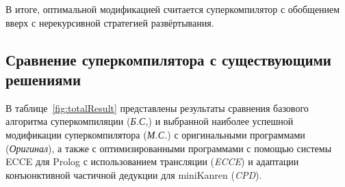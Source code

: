 В итоге, оптимальной модификацией считается суперкомпилятор с обобщением
вверх с нерекурсивной стратегией развёртывания.


\subsection{Сравнение суперкомпилятора с существующими решениями}

В таблице~\ref{fig:totalResult} представлены результаты сравнения базового алгоритма
суперкомпиляции ({\it Б.С,}) и выбранной наиболее успешной модификации
суперкомпилятора ({\it М.С.}) с оригинальными программами ({\it Оригинал}),
а также с оптимизированными программами с помощью
системы ECCE для Prolog с использованием трансляции ({\it ECCE}) и адаптации
конъюнктивной частичной дедукции для miniKanren ({\it CPD}).

